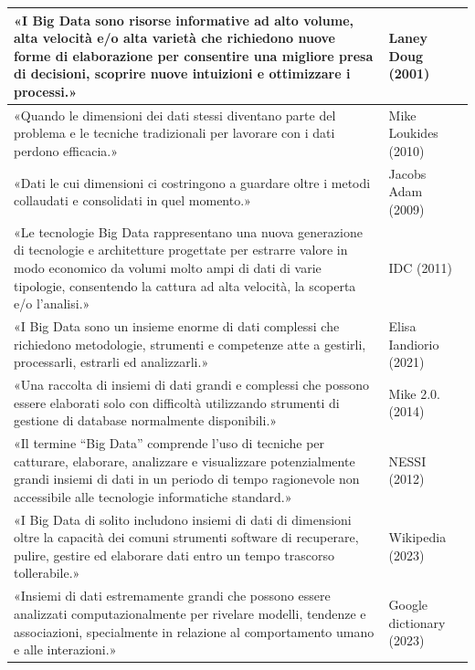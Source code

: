 \begin{longtable}{|p{11cm}|p{3cm}|}
    «I Big Data sono risorse informative ad alto volume, alta velocità e/o alta varietà che richiedono nuove forme di elaborazione per consentire una migliore presa di decisioni, scoprire nuove intuizioni e ottimizzare i processi.» 
    & Laney Doug (2001) \cite{laney_3d_data_management}\\
    \hline
    «Quando le dimensioni dei dati stessi diventano parte del problema e le tecniche tradizionali per lavorare con i dati perdono efficacia.» 
    & Mike Loukides (2010) \cite{loukides_data_science}\\
    \hline
    «Dati le cui dimensioni ci costringono a guardare oltre i metodi collaudati e consolidati in quel momento.» 
    & Jacobs Adam (2009) \cite{jacobs_big_data}\\
    \hline
    «Le tecnologie Big Data rappresentano una nuova generazione di tecnologie e architetture progettate per estrarre valore in modo economico da volumi molto ampi di dati di varie tipologie, consentendo la cattura ad alta velocità, la scoperta e/o l'analisi.» 
    & IDC (2011) \cite{idc_big_data}\\
    \hline
    «I Big Data sono un insieme enorme di dati complessi che richiedono metodologie, strumenti e competenze atte a gestirli, processarli, estrarli ed analizzarli.» 
    & Elisa Iandiorio (2021) \cite{iandorio_big_data}\\
    \hline
    «Una raccolta di insiemi di dati grandi e complessi che possono essere elaborati solo con difficoltà utilizzando strumenti di gestione di database normalmente disponibili.» 
    & Mike 2.0. (2014) \cite{mike_big_data}\\
    \hline
    «Il termine “Big Data” comprende l'uso di tecniche per catturare, elaborare, analizzare e visualizzare potenzialmente grandi insiemi di dati in un periodo di tempo ragionevole non accessibile alle tecnologie informatiche standard.» 
    & NESSI (2012) \cite{nessi_big_data}\\
    \hline
    «I Big Data di solito includono insiemi di dati di dimensioni oltre la capacità dei comuni strumenti software di recuperare, pulire, gestire ed elaborare dati entro un tempo trascorso tollerabile.» 
    & Wikipedia (2023) \cite{wikipedia_big_data}\\
    \hline
    «Insiemi di dati estremamente grandi che possono essere analizzati computazionalmente per rivelare modelli, tendenze e associazioni, specialmente in relazione al comportamento umano e alle interazioni.» 
    & Google dictionary (2023) \cite{google_big_data}\\

\end{longtable}
